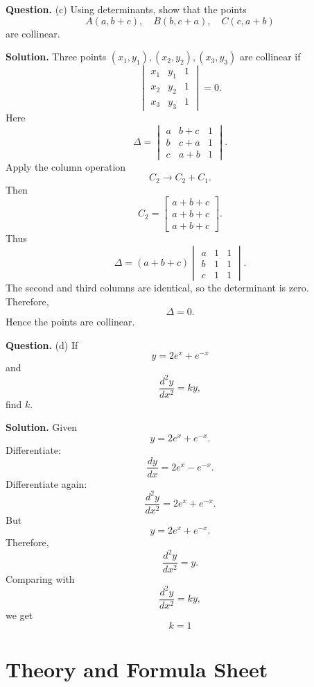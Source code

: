 \documentclass[11pt,a4paper]{article}
\newcommand{\question}[1]{\begin{questionbox}\textbf{Question.} #1\end{questionbox}}
\newcommand{\answer}{\begin{answerbox}\textbf{Solution.} }
\newcommand{\eanswer}{\end{answerbox}}
\newcommand{\finalans}[1]{\[\boxed{#1}\]}
\begin{document}
\question{(c) Using determinants, show that the points
\[
A(a,b+c),\quad B(b,c+a),\quad C(c,a+b)
\]
are collinear.}
\answer
Three points \((x_1,y_1),(x_2,y_2),(x_3,y_3)\) are collinear if
\[
\begin{vmatrix}
x_1&y_1&1\\
x_2&y_2&1\\
x_3&y_3&1
\end{vmatrix}=0.
\]
Here
\[
\Delta=
\begin{vmatrix}
a&b+c&1\\
b&c+a&1\\
c&a+b&1
\end{vmatrix}.
\]
Apply the column operation
\[
C_2\to C_2+C_1.
\]
Then
\[
C_2=\begin{bmatrix}a+b+c\\a+b+c\\a+b+c\end{bmatrix}.
\]
Thus
\[
\Delta=(a+b+c)
\begin{vmatrix}
a&1&1\\
b&1&1\\
c&1&1
\end{vmatrix}.
\]
The second and third columns are identical, so the determinant is zero. Therefore,
\[
\Delta=0.
\]
Hence the points are collinear.
\eanswer

\question{(d) If
\[
y=2e^x+e^{-x}
\]
and
\[
\frac{d^2y}{dx^2}=ky,
\]
find \(k\).}
\answer
Given
\[
y=2e^x+e^{-x}.
\]
Differentiate:
\[
\frac{dy}{dx}=2e^x-e^{-x}.
\]
Differentiate again:
\[
\frac{d^2y}{dx^2}=2e^x+e^{-x}.
\]
But
\[
y=2e^x+e^{-x}.
\]
Therefore,
\[
\frac{d^2y}{dx^2}=y.
\]
Comparing with
\[
\frac{d^2y}{dx^2}=ky,
\]
we get
\finalans{k=1}
\eanswer

\newpage
\section*{Theory and Formula Sheet}
\end{document}
